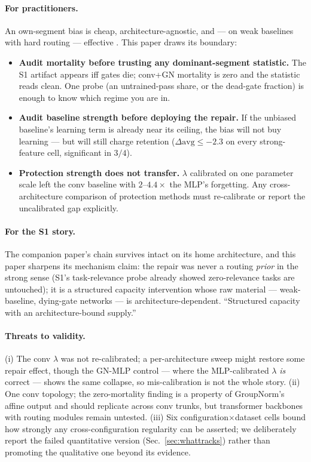 \documentclass[review]{elsarticle}
\begin{document}
\paragraph{For practitioners.} An own-segment bias is cheap,
architecture-agnostic, and --- on weak baselines with hard routing ---
effective \cite{zhou2026delpS1}. This paper draws its boundary:
\begin{itemize}
\item \textbf{Audit mortality before trusting any dominant-segment
statistic.} The S1 artifact appears iff gates die; conv+GN mortality
is zero and the statistic reads clean. One probe (an untrained-pass
share, or the dead-gate fraction) is enough to know which regime you
are in.
\item \textbf{Audit baseline strength before deploying the repair.}
If the unbiased baseline's learning term is already near its ceiling,
the bias will not buy learning --- but will still charge retention
($\Delta\mathrm{avg} \le -2.3$ on every strong-feature cell,
significant in $3/4$).
\item \textbf{Protection strength does not transfer.} $\lambda$
calibrated on one parameter scale left the conv baseline with
$2$--$4.4\times$ the MLP's forgetting. Any cross-architecture
comparison of protection methods must re-calibrate or report the
uncalibrated gap explicitly.
\end{itemize}

\paragraph{For the S1 story.} The companion paper's chain survives
intact on its home architecture, and this paper sharpens its
mechanism claim: the repair was never a routing \emph{prior} in the
strong sense (S1's task-relevance probe already showed
zero-relevance tasks are untouched); it is a structured capacity
intervention whose raw material --- weak-baseline, dying-gate
networks --- is architecture-dependent. ``Structured capacity with an
architecture-bound supply.''

\paragraph{Threats to validity.} (i) The conv $\lambda$ was not
re-calibrated; a per-architecture sweep might restore some repair
effect, though the GN-MLP control --- where the MLP-calibrated
$\lambda$ \emph{is} correct --- shows the same collapse, so
mis-calibration is not the whole story. (ii) One conv topology; the
zero-mortality finding is a property of GroupNorm's affine output and
should replicate across conv trunks, but transformer backbones with
routing modules remain untested. (iii) Six configuration$\times$dataset
cells bound how strongly any cross-configuration regularity can be
asserted; we deliberately report the failed quantitative version
(Sec.~\ref{sec:whattracks}) rather than promoting the qualitative one
beyond its evidence.
\end{document}
